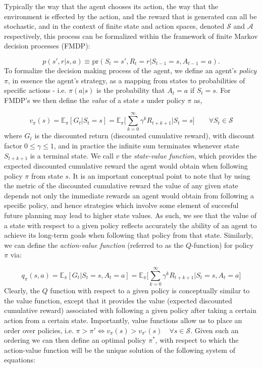 \documentclass[twocolumn,preprintnumbers,amsmath,amssymb,notitlepage,nofootinbib,longbibliography,superscriptaddress,aps,pra,10pt]{revtex4-1}
\begin{document}
    Typically the way that the agent chooses its action, the way that the environment is effected by the action, and the reward that is generated can all be stochastic, and in the context of finite state and action spaces, denoted $\mathcal{S}$ and $\mathcal{A}$ respectively, this process can be formalized within the framework of finite Markov decision processes (FMDP):

    \begin{equation}
        p(s',r|s,a) \equiv \mathrm{pr}(S_t = s',R_t = r|S_{t-1} = s, A_{t-1} = a).
    \end{equation}
    To formalize the decision making process of the agent, we define an agent's \textit{policy} $\pi$, in essence the agent's strategy, as a mapping from states to probabilities of specific actions - i.e. $\pi(a|s)$ is the probability that $A_t = a$ if $S_t = s$. For FMDP's we then define the \textit{value} of a state $s$ under policy $\pi$ as,

    \begin{equation}
        v_{\pi}(s) = \mathbb{E}_{\pi}[G_t|S_t = s]  = \mathbb{E}_{\pi} \Big[\sum_{k = 0}^{\infty}\gamma^k R_{t+k+1}\Big| S_t = s \Big] \qquad \forall S_t \in \mathcal{S}
    \end{equation}
    where $G_t$ is the discounted return (discounted cumulative reward), with discount factor $0 \leq \gamma \leq 1$, and in practice the infinite sum terminates whenever state $S_{t+k+1}$ is a terminal state. We call $v$ the \textit{state-value function}, which provides the expected discounted cumulative reward the agent would obtain when following policy $\pi$ from state $s$. It is an important conceptual point to note that by using the metric of the discounted cumulative reward the value of any given state depends not only the immediate rewards an agent would obtain from following a specific policy, and hence strategies which involve some element of succesful future planning may lead to higher state values. As such, we see that the value of a state with respect to a given policy reflects accurately the ability of an agent to achieve its long-term goals when following that policy from that state. Similarly, we can define the \textit{action-value function}  (referred to as the $Q$-function) for policy $\pi$ via:

    \begin{equation}
        q_{\pi}(s,a) = \mathbb{E}_{\pi}[G_t|S_t = s, A_t = a]  = \mathbb{E}_{\pi} \Big[\sum_{k = 0}^{\infty}\gamma^k R_{t+k+1}\Big| S_t = s, A_t = a \Big]
    \end{equation}
    Clearly, the $Q$ function with respect to a given policy is conceptually similar to the value function, except that it provides the value (expected discounted cumulative reward) associated with following a given policy after taking a certain action from a certain state. Importantly, value functions allow us to place an order over policies, i.e. $\pi > \pi' \iff v_{\pi}(s) > v_{\pi'}(s)\quad \forall s \in \mathcal{S} $. Given such an ordering we can then define an optimal policy $\pi^*$, with respect to which the action-value function will be the unique solution of the following system of equations:
\end{document}
